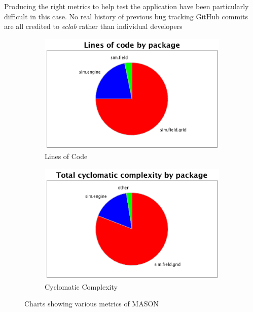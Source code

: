 \documentclass[11pt]{article}
\begin{document}
Producing the right metrics to help test the application have been particularly difficult in this case.
No real history of previous bug tracking
GitHub commits are all credited to \textit{eclab} rather than individual developers
\\

\begin{figure}
\begin{subfigure}[b]{0.5\textwidth}
\includegraphics[width=\textwidth]{Appendix/LOC}
\caption{Lines of Code}
\label{fig:loc}
\end{subfigure}
\begin{subfigure}[b]{0.5\textwidth}
\includegraphics[width=\textwidth]{Appendix/Cyclomatic}
\caption{Cyclomatic Complexity}
\label{fig:cc}
\end{subfigure}

\caption{Charts showing various metrics of MASON}
\label{fig:metric_charts}
\end{figure}
\end{document}
